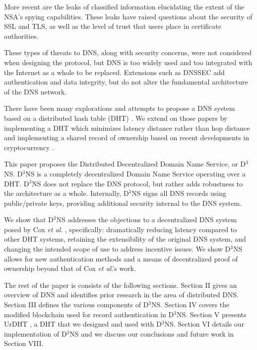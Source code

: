More recent are the leaks of classified information elucidating the extent of the NSA's spying capabilities. These leaks have raised questions about the security of SSL and TLS, as well as the level of trust that users place in certificate authorities.


These types of threats to DNS, along with security concerns, were not considered when designing the protocol, but DNS is too widely used and too integrated with the Internet as a whole to be replaced. Extensions such as DNSSEC \cite{blacka2013clarifications} add authentication and data integrity, but do not alter the fundamental architecture of the DNS network.


There have been many explorations and attempts \cite{cox2002serving} \cite{pappas2006comparative} \cite{ramasubramanian2004design} to propose a DNS system based on a distributed hash table (DHT) \cite{chord}. We extend on those papers by implementing a DHT which minimizes latency distance rather than hop distance and implementing a shared record of ownership based on recent developments in cryptocurrency \cite{namecoin} \cite{bitcoin}.


This paper proposes the Distributed Decentralized Domain Name Service, or D$^{3}$NS.  D$^{3}$NS is a completely decentralized Domain Name Service operating over a DHT.  D$^{3}$NS does not replace the DNS protocol, but rather adds robustness to the architecture as a whole.  Internally, D$^3$NS signs all DNS records using public/private keys, providing additional security internal to the DNS system.

We show that D$^{3}$NS addresses the objections to a decentralized DNS system posed by Cox \textit{et al}. \cite{cox2002serving}, specifically: dramatically reducing latency compared to other DHT systems, retaining the extensibility of the original DNS system, and changing the intended scope of use to address incentive issues. We show D$^{3}$NS allows for new authentication methods and a means of decentralized proof of ownership beyond that of Cox \textit{et al}.'s work. 


The rest of the paper is consists of the following sections.  Section II gives an overview of DNS and identifies prior research in the area of distributed DNS.  Section III defines the various components of D$^3$NS.  Section IV covers the modified blockchain used for record authentication in D$^3$NS.  Section V presents UrDHT \cite{urdht}, a DHT that we designed and used with D$^3$NS.  Section VI details our implementation of D$^3$NS and  we discuss our conclusions and future work in Section VIII.



